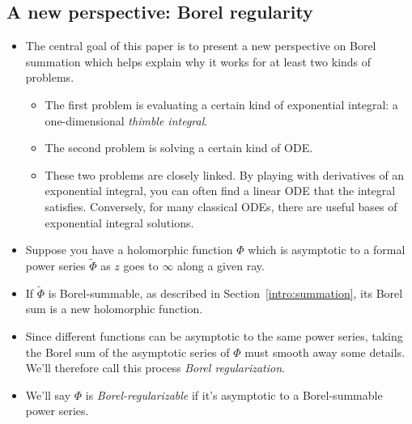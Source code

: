 \documentclass{article}
\newcommand{\series}{\tilde}
\begin{document}
\subsection{A new perspective: Borel regularity}
\begin{itemize}
\item The central goal of this paper is to present a new perspective on Borel summation which helps explain why it works for at least two kinds of problems.
\begin{itemize}
\item The first problem is evaluating a certain kind of exponential integral: a one-dimensional {\em thimble integral}.
\item The second problem is solving a certain kind of ODE.
\item These two problems are closely linked. By playing with derivatives of an exponential integral, you can often find a linear ODE that the integral satisfies. Conversely, for many classical ODEs, there are useful bases of exponential integral solutions.
\end{itemize}
\item Suppose you have a holomorphic function $\Phi$ which is asymptotic to a formal power series $\series{\Phi}$ as $z$ goes to $\infty$ along a given ray.
\item If $\series{\Phi}$ is Borel-summable, as described in Section~\ref{intro:summation}, its Borel sum is a new holomorphic function.
\item Since different functions can be asymptotic to the same power series, taking the Borel sum of the asymptotic series of $\Phi$ must smooth away some details. We'll therefore call this process {\em Borel regularization}.
\item We'll say $\Phi$ is {\em Borel-regularizable} if it's asymptotic to a Borel-summable power series.

\end{itemize}
\end{document}
